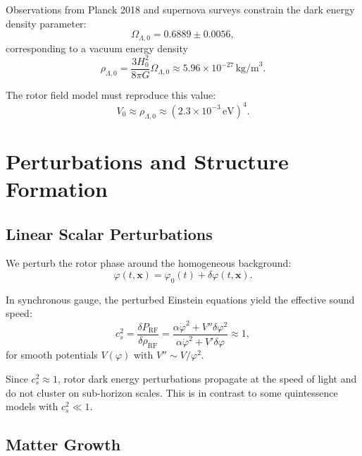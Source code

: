 \documentclass[11pt,a4paper]{article}
\numberwithin{equation}{section}
\theoremstyle{plain}
\theoremstyle{definition}
\theoremstyle{remark}
\begin{document}
Observations from Planck 2018 and supernova surveys constrain the dark energy density parameter:
\begin{equation}
\Omega_{\Lambda,0} = 0.6889 \pm 0.0056,
\end{equation}
corresponding to a vacuum energy density
\begin{equation}
\rho_{\Lambda,0} = \frac{3H_0^2}{8\pi G}\Omega_{\Lambda,0} \approx 5.96 \times 10^{-27}\,\mathrm{kg/m}^3.
\end{equation}

The rotor field model must reproduce this value:
\begin{equation}
V_0 \approx \rho_{\Lambda,0} \approx (2.3 \times 10^{-3}\,\mathrm{eV})^4.
\label{eq:V0-constraint}
\end{equation}

\section{Perturbations and Structure Formation}
\label{sec:pert}

\subsection{Linear Scalar Perturbations}

We perturb the rotor phase around the homogeneous background:
\begin{equation}
\varphi(t,\mathbf{x}) = \varphi_0(t) + \delta\varphi(t,\mathbf{x}).
\end{equation}

In synchronous gauge, the perturbed Einstein equations yield the effective sound speed:
\begin{equation}
c_s^2 = \frac{\delta P_{\mathrm{RF}}}{\delta \rho_{\mathrm{RF}}} = \frac{\alpha\dot{\varphi}^2 + V''\delta\varphi^2}{\alpha\dot{\varphi}^2 + V'\delta\varphi} \approx 1,
\label{eq:sound-speed}
\end{equation}
for smooth potentials $V(\varphi)$ with $V'' \sim V/\varphi^2$.

Since $c_s^2 \approx 1$, rotor dark energy perturbations propagate at the speed of light and do not cluster on sub-horizon scales. This is in contrast to some quintessence models with $c_s^2 \ll 1$.

\subsection{Matter Growth}
\end{document}
